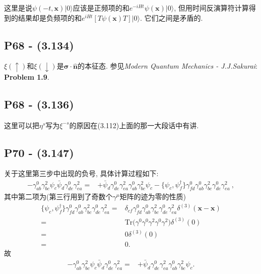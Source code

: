 \documentclass[10pt,b5paper,openany]{book}
\begin{document}
这里是说$\psi(-t, \mathbf{x})|0\rangle$应该是正频项的和$e^{-iHt}\psi(\mathbf{x})|0\rangle$, 但用时间反演算符计算得到的结果却是负频项的和$e^{iHt}[T\psi(\mathbf{x})T]|0\rangle$. 它们之间是矛盾的. 

\subsection{P68 - (3.134)}

$\xi(\uparrow)$和$\xi(\downarrow)$是$\boldsymbol{\sigma}\cdot\mathbf{\hat{n}}$的本征态. 参见\textit{Modern Quantum Mechanics - J.J.Sakurai}: \textbf{Problem 1.9}. 

\subsection{P68 - (3.136)}

这里可以把$\eta^s$写为$\xi^{-s}$的原因在(3.112)上面的那一大段话中有讲.

\subsection{P70 - (3.147)}

关于这里第三步中出现的负号, 具体计算过程如下: 
\begin{equation*}
  \begin{aligned}
    -\gamma^0_{ab}\gamma^2_{bc}\psi_c\bar{\psi}_d\gamma^0_{de}\gamma^2_{ea} =& +\bar{\psi}_d \gamma^0_{de}\gamma^2_{ea}\gamma^0_{ab}\gamma^2_{bc}\psi_c - \bigl\{\psi_c,\psi_f^\dagger\bigr\}\gamma^0_{fd} \gamma^0_{ab}\gamma^2_{bc}\gamma^0_{de}\gamma^2_{ea}\ , 
  \end{aligned}
\end{equation*} 
其中第二项为(第三行用到了奇数个$\gamma^{\mu}$矩阵的迹为零的性质)
\begin{equation*}
  \begin{aligned}
    \bigl\{\psi_c,\psi_f^\dagger\bigr\}\gamma^0_{fd} \gamma^0_{ab}\gamma^2_{bc}\gamma^0_{de}\gamma^2_{ea} =& \delta_{cf}\gamma^0_{fd}\gamma^0_{ab}\gamma^2_{bc}\gamma^0_{de}\gamma^2_{ea}\delta^{(3)}(\mathbf{x}-\mathbf{x})\\
    =& \mathrm{Tr}\bigl(\gamma^0 \gamma^0 \gamma^2 \gamma^0 \gamma^2\bigr)\delta^{(3)}(0)\\
    =& 0 \delta^{(3)}(0)\\
    =& 0. 
  \end{aligned}
\end{equation*} 
故
\begin{equation*}
  \begin{aligned}
    -\gamma^0_{ab}\gamma^2_{bc}\psi_c\bar{\psi}_d\gamma^0_{de}\gamma^2_{ea} =& +\bar{\psi}_d \gamma^0_{de}\gamma^2_{ea}\gamma^0_{ab}\gamma^2_{bc}\psi_c.
  \end{aligned}
\end{equation*} 
\end{document}
